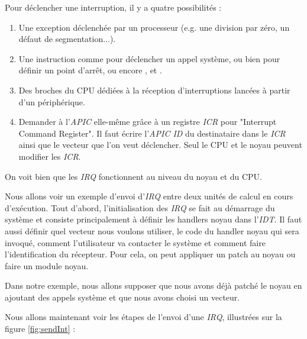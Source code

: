 Pour déclencher une interruption, il y a quatre possibilités :

\begin{enumerate}
  \item Une exception déclenchée par un processeur (e.g. une division par zéro, un défaut de segmentation...).
  \item Une instruction comme  pour déclencher un appel système, ou bien  pour définir un point d'arrêt, ou encore ,  et .
  \item Des broches du CPU dédiées à la réception d'interruptions lancées à partir d'un périphérique.
  \item Demander à l'\emph{APIC} elle-même grâce à un registre \emph{ICR} pour "Interrupt Command Register".
  Il faut écrire l'\emph{APIC ID} du destinataire dans le \emph{ICR} ainsi que le vecteur que l'on veut déclencher.
  Seul le CPU et le noyau peuvent modifier les \emph{ICR}.
\end{enumerate}

On voit bien que les \emph{IRQ} fonctionnent au niveau du noyau et du CPU.

Nous allons voir un exemple d'envoi d'\emph{IRQ} entre deux unités de calcul en cours d'exécution.
Tout d'abord, l'initialisation des \emph{IRQ} se fait au démarrage du système et consiste principalement à définir les handlers noyau dans l'\emph{IDT}.
Il faut aussi définir quel vecteur nous voulons utiliser, le code du handler noyau qui sera invoqué,
comment l'utilisateur va contacter le système et comment faire l'identification du récepteur.
Pour cela, on peut appliquer un patch au noyau ou faire un module noyau.

Dans notre exemple, nous allons supposer que nous avons déjà patché le noyau en ajoutant des appels système et que nous avons choisi un vecteur.

Nous allons maintenant voir les étapes de l'envoi d'une \emph{IRQ}, illustrées sur la figure \ref{fig:sendInt} :

